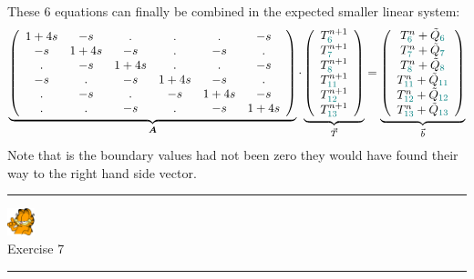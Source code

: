These 6 equations can finally be combined in the expected smaller linear system:
\[
\underbrace{
\left(
\begin{array}{cccccc}
1+4s & -s & . & . & . & -s \\
-s & 1+4s & -s & . & -s & . \\
. & -s & 1+4s & . & . & -s \\ 
-s & . & -s & 1+4s & -s & . \\
. & -s & . & -s & 1+4s & -s \\
. & . & -s & . & -s & 1+4s 
\end{array}
\right)
}_{\bm A}
\cdot
\underbrace{
\left(
\begin{array}{c}
T_{{\color{teal}6}}^{n+1} \\ 
T_{{\color{teal}7}}^{n+1} \\ 
T_{{\color{teal}8}}^{n+1} \\ 
T_{{\color{teal}11}}^{n+1} \\ 
T_{{\color{teal}12}}^{n+1} \\ 
T_{{\color{teal}13}}^{n+1} 
\end{array}
\right)
}_{\vec T}
=
\underbrace{
\left(
\begin{array}{c}
T_{{\color{teal}6}}^n + \tilde{Q}_{\color{teal}6} \\ 
T_{{\color{teal}7}}^n + \tilde{Q}_{\color{teal}7} \\ 
T_{{\color{teal}8}}^n + \tilde{Q}_{\color{teal}8} \\ 
T_{{\color{teal}11}}^n + \tilde{Q}_{\color{teal}11} \\ 
T_{{\color{teal}12}}^n + \tilde{Q}_{\color{teal}12} \\ 
T_{{\color{teal}13}}^n + \tilde{Q}_{\color{teal}13} 
\end{array}
\right)
}_{\vec b}
\]
Note that is the boundary values had not been zero they would have found their way to the right hand side 
vector.



\begin{center}
\begin{minipage}[t]{0.77\textwidth}
\par\noindent\rule{\textwidth}{0.4pt}
\begin{center}
\includegraphics[width=0.8cm]{images/garftr} \\
{\color{orange}Exercise 7}
\end{center}


 
\par\noindent\rule{\textwidth}{0.4pt}
\end{minipage}
\end{center}
